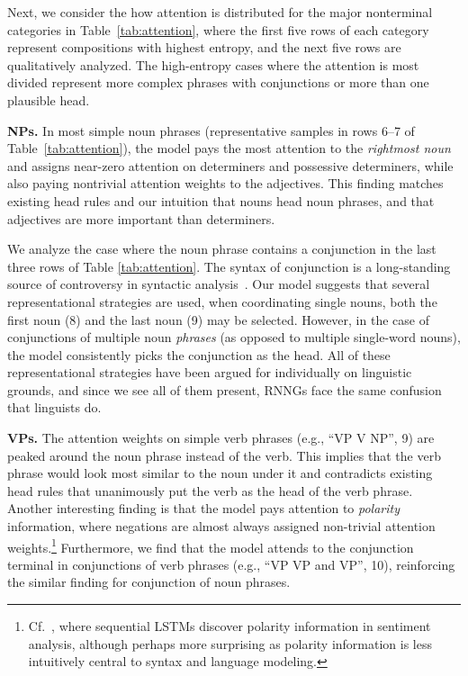 \documentclass[11pt]{article}
\newcommand{\ask}[1]{\textcolor{orange}{{\textbf{[#1 --\textsc{ask}]}}}}
\renewcommand{\ask}[1]{}
\begin{document}
Next, we consider the how attention is distributed for the major nonterminal categories in Table~\ref{tab:attention}, where the first five rows of each category represent compositions with highest entropy, and the next five rows are qualitatively analyzed.  The high-entropy cases where the attention is most divided represent more complex phrases with conjunctions or more than one plausible head.\ask{Make sure this is not controversial}

\textbf{NPs.} In most simple noun phrases (representative samples in rows 6--7 of Table~\ref{tab:attention}), the model pays the most attention to the \emph{rightmost noun} and assigns near-zero attention on determiners and possessive determiners, while also paying nontrivial attention weights to the adjectives. This finding matches existing head rules and our intuition that nouns head noun phrases, and that adjectives are more important than determiners. 

We analyze the case where the noun phrase contains a conjunction in the last three rows of Table \ref{tab:attention}. The syntax of conjunction is a long-standing source of controversy in syntactic analysis~\cite[\emph{inter alia}]{johannessen:1998}. Our model suggests that several representational strategies are used, when coordinating single nouns, both the first noun (8) and the last noun (9) may be selected. However, in the case of conjunctions of multiple noun \emph{phrases} (as opposed to multiple single-word nouns), the model consistently picks the conjunction as the head. All of these representational strategies have been argued for individually on linguistic grounds, and since we see all of them present, RNNGs face the same confusion that linguists do.

\textbf{VPs.} The attention weights on simple verb phrases (e.g., ``VP  V NP'', 9) are peaked around the noun phrase instead of the verb. This implies that the verb phrase would look most similar to the noun under it and contradicts existing head rules that unanimously put the verb as the head of the verb phrase. 
Another interesting finding is that the model pays attention to \emph{polarity} information, where negations are almost always assigned non-trivial attention weights.\footnote{Cf.~, where sequential LSTMs discover polarity information in sentiment analysis, although perhaps more surprising as polarity information is less intuitively central to syntax and language modeling.} Furthermore, we find that the model attends to the conjunction terminal in conjunctions of verb phrases (e.g., ``VP  VP and VP'', 10), reinforcing the similar finding for conjunction of noun phrases.
\end{document}
